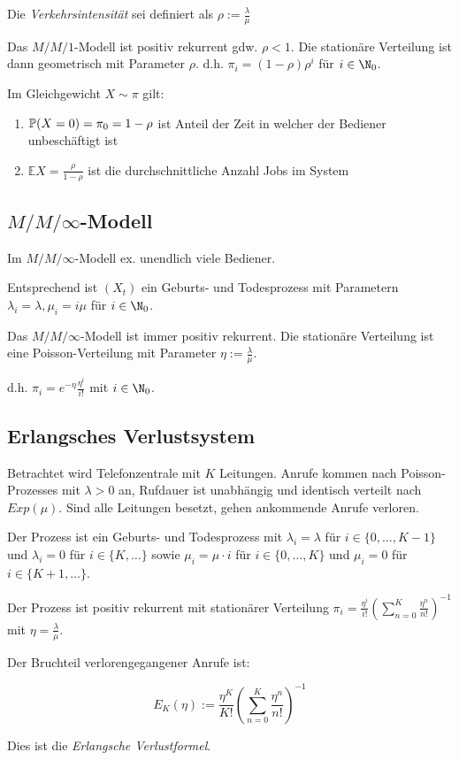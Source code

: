 Die \emph{Verkehrsintensität} sei definiert als $\rho := \frac{\lambda}{\mu}$

\spacing

Das $M/M/1$-Modell ist positiv rekurrent gdw. $\rho < 1$. Die stationäre Verteilung ist dann geometrisch mit Parameter $\rho$. d.h. $\pi_i = (1-\rho)\rho^i$ für $i \in \N_0$.

\vspace*{1mm}

Im Gleichgewicht $X \sim \pi$ gilt:

\begin{enumerate}[label=(\alph*)]
	\item $\P(X=0) = \pi_0 = 1 - \rho$ ist Anteil der Zeit in welcher der Bediener unbeschäftigt ist
	\item $\mathbb{E}X = \frac{\rho}{1-\rho}$ ist die durchschnittliche Anzahl Jobs im System
\end{enumerate}

\subsection*{$M/M/\infty$-Modell}

Im $M/M/\infty$-Modell ex. unendlich viele Bediener.

Entsprechend ist $(X_t)$ ein Geburts- und Todesprozess mit Parametern $\lambda_i = \lambda, \mu_i = i\mu$ für $i \in \N_0$.

\vspace*{1mm}

Das $M/M/\infty$-Modell ist immer positiv rekurrent. Die stationäre Verteilung ist eine Poisson-Verteilung mit Parameter $\eta := \frac{\lambda}{\mu}$.

d.h. $\pi_i = e^{-\eta}\frac{\eta^i}{i!}$ mit $i \in \N_0$.

\subsection*{Erlangsches Verlustsystem}

Betrachtet wird Telefonzentrale mit $K$ Leitungen. Anrufe kommen nach Poisson-Prozesses mit $\lambda > 0$ an, Rufdauer ist unabhängig und identisch verteilt nach $Exp(\mu)$. Sind alle Leitungen besetzt, gehen ankommende Anrufe verloren.

Der Prozess ist ein Geburts- und Todesprozess mit $\lambda_i = \lambda$ für $i \in \{0,\dots,K-1\}$ und $\lambda_i = 0$ für $i \in \{K,\dots\}$ sowie $\mu_i = \mu \cdot i$ für $i \in \{0,\dots,K\}$ und $\mu_i = 0$ für $i \in \{K+1,\dots\}$.

Der Prozess ist positiv rekurrent mit stationärer Verteilung $\pi_i = \frac{\eta^i}{i!}\left(\sum_{n=0}^K \frac{\eta^n}{n!}\right)^{-1}$ mit $\eta = \frac{\lambda}{\mu}$.

Der Bruchteil verlorengegangener Anrufe ist:

\vspace*{-2mm}
$$E_K(\eta) := \frac{\eta^K}{K!} \left( \sum_{n=0}^K \frac{\eta^n}{n!} \right)^{-1}$$

Dies ist die \emph{Erlangsche Verlustformel}.
